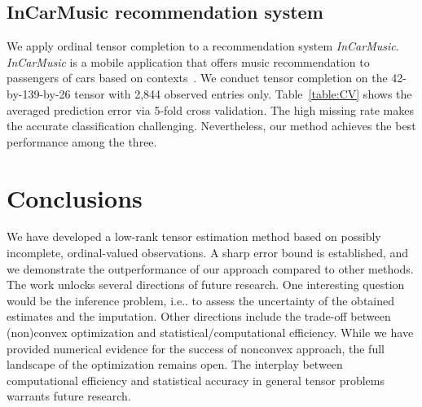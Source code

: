 \documentclass{article}
\theoremstyle{plain}
\theoremstyle{definition}
\begin{document}
\subsection{InCarMusic recommendation system}
We apply ordinal tensor completion to a recommendation system {\it InCarMusic}. {\it InCarMusic} is a mobile application that offers music recommendation to passengers of cars based on contexts~\cite{baltrunas2011incarmusic}. We conduct tensor completion on the 42-by-139-by-26 tensor with 2,844 observed entries only. Table~\ref{table:CV} shows the averaged prediction error via 5-fold cross validation. The high missing rate makes the accurate classification challenging. Nevertheless, our method achieves the best performance among the three.

\section{Conclusions}
We have developed a low-rank tensor estimation method based on possibly incomplete, ordinal-valued observations. A sharp error bound is established, and we demonstrate the outperformance of our approach compared to other methods. The work unlocks several directions of future research. One interesting question would be the inference problem, i.e.. to assess the uncertainty of the obtained estimates and the imputation. Other directions include the trade-off between (non)convex optimization and statistical/computational efficiency. While we have provided numerical evidence for the success of nonconvex approach, the full landscape of the optimization remains open. The interplay between computational efficiency and statistical accuracy in general tensor problems warrants future research.

\newpage


\end{document}
